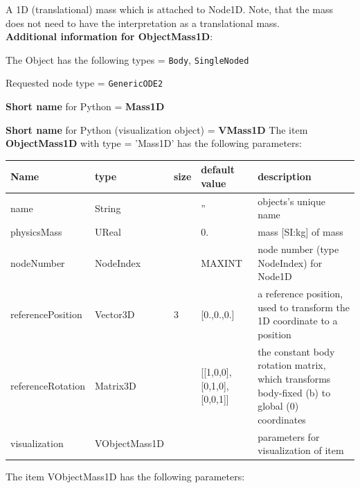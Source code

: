 %
\newpage

\label{sec:item:ObjectMass1D}
A 1D (translational) mass which is attached to Node1D. Note, that the mass does not need to have the interpretation as a translational mass.\vspace{12pt}
 \\{\bf Additional information for ObjectMass1D}:
\bi
  \item The Object has the following types = \texttt{Body}, \texttt{SingleNoded}
  \item Requested node type = \texttt{GenericODE2}
  \item {\bf Short name} for Python = {\bf Mass1D}  \item {\bf Short name} for Python (visualization object) = {\bf VMass1D}\ei
\vspace{12pt} \noindent The item {\bf ObjectMass1D} with type = 'Mass1D' has the following parameters:\vspace{-1cm}\\ 
\begin{center}
  \footnotesize
  \begin{longtable}{| p{4.5cm} | p{2.5cm} | p{0.5cm} | p{2.5cm} | p{6cm} |}
    \hline
    \bf Name & \bf type & \bf size & \bf default value & \bf description \\ \hline
    name &     String &      &     '' &     objects's unique name\\ \hline
    physicsMass &     UReal &      &     0. &     mass [SI:kg] of mass\\ \hline
    nodeNumber &     NodeIndex &      &     MAXINT &     node number (type NodeIndex) for Node1D\\ \hline
    referencePosition &     Vector3D &     3 &     [0.,0.,0.] &     a reference position, used to transform the 1D coordinate to a position\\ \hline
    referenceRotation &     Matrix3D &      &     [[1,0,0], [0,1,0], [0,0,1]] &     the constant body rotation matrix, which transforms body-fixed (b) to global (0) coordinates\\ \hline
    visualization & VObjectMass1D & & & parameters for visualization of item \\ \hline
	  \end{longtable}
	\end{center}
The item VObjectMass1D has the following parameters:\vspace{-1cm}\\ 
